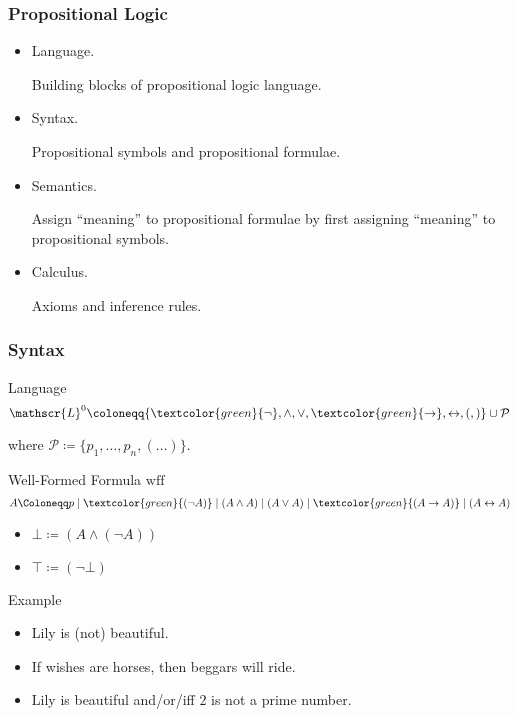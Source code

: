 \documentclass[UTF8,aspectratio=43,11pt,colorlinks,compress,openany]{beamer}%
\begin{document}
\begin{frame}\frametitle{Propositional Logic}
	\begin{itemize}
		\item Language.
		
		Building blocks of propositional logic language.
		\item Syntax.
		
		Propositional symbols and propositional formulae.
		\item Semantics.
		
		Assign ``meaning'' to propositional formulae by first assigning ``meaning'' to propositional symbols.
		\item Calculus.
		
		Axioms and inference rules.
	\end{itemize}
\end{frame}

\begin{frame}\frametitle{Syntax}
		\begin{block}{Language}
			\[\mathscr{L}^0\coloneqq \{\textcolor{green}{\neg},\wedge,\vee,\textcolor{green}{\to},\leftrightarrow,(,)\}\cup\mathcal{P}\]
		\end{block}
		where $\mathcal{P}\coloneqq \{p_1,\dots,p_n,(\dots)\}$.
		\begin{block}{Well-Formed Formula $\mathrm{wff}$}
			\[A\Coloneqq p\mid \textcolor{green}{(\neg A)}\mid (A\wedge A)\mid (A\vee A)\mid \textcolor{green}{(A\to A)}\mid (A\leftrightarrow A)\]
		\end{block}
		\begin{itemize}
			\item $\bot\coloneqq (A\wedge(\neg A))$
			\item $\top\coloneqq (\neg\bot)$
		\end{itemize}
		\begin{block}{Example}
			\begin{itemize}
				\item Lily is (not) beautiful.
				\item If wishes are horses, then beggars will ride.
				\item Lily is beautiful and/or/iff $2$ is not a prime number.
			\end{itemize}
		\end{block}
\end{frame}
\end{document}
